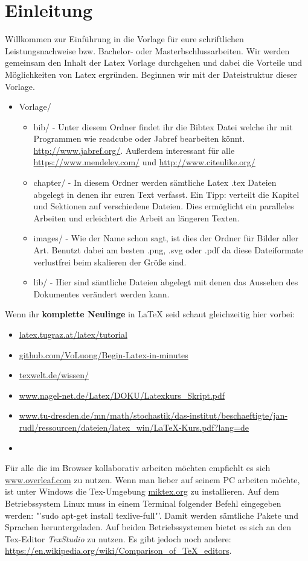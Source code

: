 \chapter{Einleitung}
Willkommen zur Einführung in die Vorlage für eure schriftlichen Leistungsnachweise bzw. Bachelor- oder Masterbschlussarbeiten. Wir werden gemeinsam den Inhalt der Latex Vorlage durchgehen und dabei die Vorteile und Möglichkeiten von Latex ergründen. Beginnen wir mit der Dateistruktur dieser Vorlage.

\begin{itemize}
	\item Vorlage/
		\begin{itemize}
			\item bib/ - Unter diesem Ordner findet ihr die Bibtex Datei welche ihr mit Programmen wie readcube oder Jabref bearbeiten könnt. \url{http://www.jabref.org/}. Außerdem interessant für alle \url{https://www.mendeley.com/} und \url{http://www.citeulike.org/}
			\item chapter/ - In diesem Ordner werden sämtliche Latex .tex Dateien abgelegt in denen ihr euren Text verfasst. Ein Tipp: verteilt die Kapitel und Sektionen auf verschiedene Dateien. Dies ermöglicht ein paralleles Arbeiten und erleichtert die Arbeit an längeren Texten.
			\item images/ - Wie der Name schon sagt, ist dies der Ordner für Bilder aller Art. Benutzt dabei am besten .png, .svg oder .pdf da diese Dateiformate verlustfrei beim skalieren der Größe sind.
			\item lib/ - Hier sind sämtliche Dateien abgelegt mit denen das Aussehen des Dokumentes verändert werden kann. 
		\end{itemize}
\end{itemize}

Wenn ihr \textbf{komplette Neulinge} in LaTeX seid schaut gleichzeitig hier vorbei:
\begin{itemize}
	\item \url{latex.tugraz.at/latex/tutorial}
	\item \url{github.com/VoLuong/Begin-Latex-in-minutes}
	\item \url{texwelt.de/wissen/}
	\item \url{www.nagel-net.de/Latex/DOKU/Latexkurs_Skript.pdf}
	\item \url{www.tu-dresden.de/mn/math/stochastik/das-institut/beschaeftigte/jan-rudl/ressourcen/dateien/latex_win/LaTeX-Kurs.pdf?lang=de}
	\item {}
\end{itemize} 
Für alle die im Browser kollaborativ arbeiten möchten empfiehlt es sich \url{www.overleaf.com} zu nutzen. Wenn man lieber auf seinem PC arbeiten möchte, ist unter Windows die Tex-Umgebung \url{miktex.org} zu installieren. Auf dem Betriebssystem Linux muss in einem Terminal folgender Befehl eingegeben werden: "'sudo apt-get install texlive-full"'. Damit werden sämtliche Pakete und Sprachen heruntergeladen. Auf beiden Betriebssystemen bietet es sich an den Tex-Editor \emph{TexStudio} zu nutzen. Es gibt jedoch noch andere: \url{https://en.wikipedia.org/wiki/Comparison_of_TeX_editors}.

